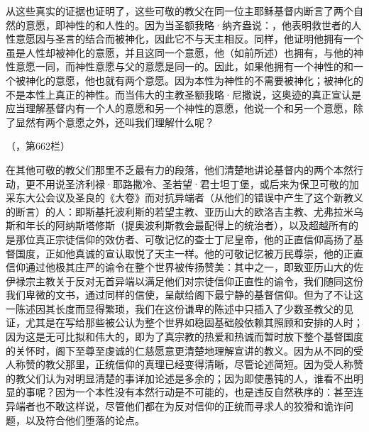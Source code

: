 从这些真实的证据也证明了，这些可敬的教父在同一位主耶稣基督内断言了两个自然的意愿，即神性的和人性的。因为当圣额我略·纳齐盎说：，他表明救世者的人性意愿因与圣言的结合而被神化，因此它不与天主相反。同样，他证明他拥有一个虽是人性却被神化的意愿，并且这同一个意愿，他（如前所述）也拥有，与他的神性意愿一同，而神性意愿与父的意愿是同一的。因此，如果他拥有一个神性的和一个被神化的意愿，他也就有两个意愿。因为本性为神性的不需要被神化；被神化的不是本性上真正的神性。而当伟大的主教圣额我略·尼撒说，这奥迹的真正宣认是应当理解基督内有一个人的意愿和另一个神性的意愿，他说一个和另一个意愿，除了显然有两个意愿之外，还叫我们理解什么呢？\par

（，第662栏）\par

在其他可敬的教父们那里不乏最有力的段落，他们清楚地讲论基督内的两个本然行动，更不用说圣济利禄·耶路撒冷、圣若望·君士坦丁堡，或后来为保卫可敬的加采东大公会议及圣良的《大卷》而对抗异端者（从他们的错误中产生了这个新教义的断言）的人：即斯基托波利斯的若望主教、亚历山大的欧洛吉主教、尤弗拉米乌斯和年长的阿纳斯塔修斯（提奥波利斯教会最配得上的统治者），以及超越所有的是那位真正宗徒信仰的效仿者、可敬记忆的查士丁尼皇帝，他的正直信仰高扬了基督国度，正如他真诚的宣认取悦了天主一样。他的可敬记忆被万民尊崇，他的正直信仰通过他极其庄严的谕令在整个世界被传扬赞美：其中之一，即致亚历山大的佐伊禄宗主教关于反对无首异端以满足他们对宗徒信仰正直性的谕令，我们随同这份我们卑微的文书，通过同样的信使，呈献给阁下最宁静的基督信仰。但为了不让这一陈述因其长度而显得繁琐，我们在这份谦卑的陈述中只插入了少数圣教父的见证，尤其是在写给那些被公认为整个世界如稳固基础般依赖其照顾和安排的人时；因为这是无可比拟和伟大的，即为了真宗教的热爱和热诚而暂时放下整个基督国度的关怀时，阁下至尊至虔诚的仁慈愿意更清楚地理解宣讲的教义。因为从不同的受人称赞的教父那里，正统信仰的真理已经变得清晰，尽管论述简短。因为受人称赞的教父们认为对明显清楚的事详加论述是多余的；因为即使愚钝的人，谁看不出明显的事呢？因为一个本性没有本然行动是不可能的，也是违反自然秩序的：甚至连异端者也不敢这样说，尽管他们都在为反对信仰的正统而寻求人的狡猾和诡诈问题，以及符合他们堕落的论点。\par

